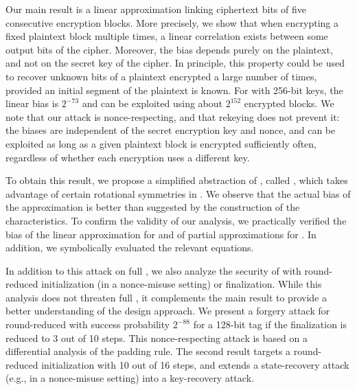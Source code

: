 Our main result is a linear approximation \cite{eurocryptMatsui93,eurocryptMatsuiY92} linking ciphertext bits of five consecutive encryption blocks.
More precisely, we show that when encrypting a fixed plaintext block multiple times, a linear correlation exists between some output bits of the cipher.
Moreover, the bias depends purely on the plaintext, and not on the secret key of the cipher.
In principle, this property could be used to recover unknown bits of a plaintext encrypted a large number of times, provided an initial segment of the plaintext is known.
For \MORUS[1280] with 256-bit keys, the linear bias is $2^{-73}$
and can be exploited using about $2^{152}$ encrypted blocks.
We note that our attack is nonce-respecting, and that rekeying does not prevent it: the biases are independent of the secret encryption key and nonce, and can be exploited as long as a given plaintext block is encrypted sufficiently often, regardless of whether each encryption uses a different key.

To obtain this result, we propose a simplified abstraction of \MORUS, called \MiniMORUS, which takes advantage of certain rotational symmetries in \MORUS.
We observe that the actual bias of the approximation is better than suggested by the construction of the characteristics.
To confirm the validity of our analysis,
we practically verified the bias of the linear approximation for \MiniMORUS and of partial approximations for \MORUS.
In addition, we symbolically evaluated the relevant equations.

In addition to this attack on full \MORUS, we also analyze the security of \MORUS with round-reduced initialization (in a nonce-misuse setting) or finalization.
While this analysis does not threaten full \MORUS, it complements the main result to provide a better understanding of the \MORUS design approach.
We present a forgery attack for round-reduced \MORUS[1280] with success probability $2^{-88}$ for a 128-bit tag if the finalization is reduced to 3 out of 10 steps. This nonce-respecting attack is based on a differential analysis of the padding rule.
The second result targets a round-reduced initialization with 10 out of 16 steps, and extends a state-recovery attack (e.g., in a nonce-misuse setting) into a key-recovery attack.


